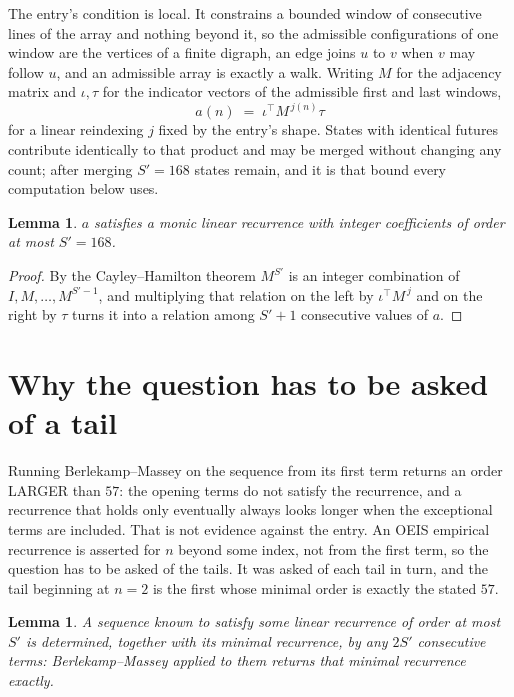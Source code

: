 \documentclass[11pt,a4paper]{article}
\theoremstyle{plain}
\newtheorem{lemma}[theorem]{Lemma}
\theoremstyle{definition}
\begin{document}
The entry's condition is local. It constrains a bounded window of consecutive lines of the
array and nothing beyond it, so the admissible configurations of one window are the vertices of
a finite digraph, an edge joins $u$ to $v$ when $v$ may follow $u$, and an admissible array is
exactly a walk. Writing $M$ for the adjacency matrix and $\iota,\tau$ for the indicator vectors
of the admissible first and last windows,
\[
a(n)\;=\;\iota^{\!\top}M^{\,j(n)}\tau
\]
for a linear reindexing $j$ fixed by the entry's shape. States with identical futures
contribute identically to that product and may be merged without changing any count; after
merging $S'=168$ states remain, and it is that bound every computation below uses.

\begin{lemma}\label{lem:cf}
$a$ satisfies a monic linear recurrence with integer coefficients of order at most $S'=168$.
\end{lemma}

\begin{proof}
By the Cayley--Hamilton theorem $M^{S'}$ is an integer combination of $I,M,\dots,M^{S'-1}$,
and multiplying that relation on the left by $\iota^{\!\top}M^{\,j}$ and on the right by
$\tau$ turns it into a relation among $S'+1$ consecutive values of $a$.
\end{proof}

\section{Why the question has to be asked of a tail}

Running Berlekamp--Massey on the sequence from its first term returns an order LARGER than $57$: the opening terms do not satisfy the recurrence, and a recurrence that holds only eventually always looks longer when the exceptional terms are included. That is not evidence against the entry. An OEIS empirical recurrence is asserted for $n$ beyond some index, not from the first term, so the question has to be asked of the tails. It was asked of each tail in turn, and the tail beginning at $n=2$ is the first whose minimal order is exactly the stated $57$.

\begin{lemma}\label{lem:bm}
A sequence known to satisfy some linear recurrence of order at most $S'$ is determined,
together with its minimal recurrence, by any $2S'$ consecutive terms: Berlekamp--Massey applied
to them returns that minimal recurrence exactly.
\end{lemma}
\end{document}
